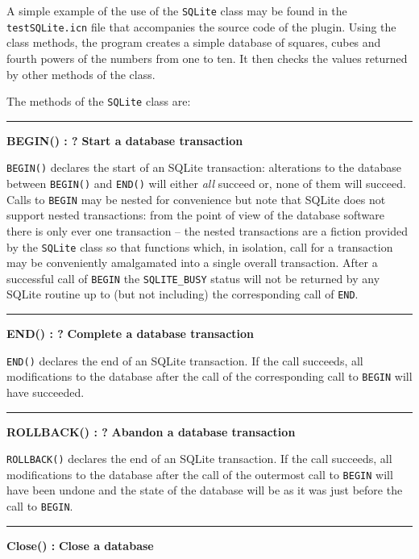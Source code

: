 \noindent
A simple example of the use of the \texttt{SQLite} class may be found in the
\texttt{testSQLite.icn} file that accompanies the source code of the plugin.
Using the class methods, the program creates a simple database of squares, cubes
and fourth powers of the numbers from one to ten. It then checks the values
returned by other methods of the class.

\noindent
The methods of the \texttt{SQLite} class are:
\bigskip\hrule\vspace{0.1cm}
\noindent
{\bf BEGIN() : ? } \hfill {\bf Start a database transaction}

\noindent
\texttt{BEGIN()} declares the start of an SQLite transaction: alterations to
the database between \texttt{BEGIN()} and \texttt{END()} will either {\em
  all\/} succeed or, none of them will succeed. Calls to \texttt{BEGIN} may
be nested for convenience but note that SQLite does not support nested
transactions: from the point of view of the database software there is only
ever one transaction -- the nested transactions are a fiction provided by the
\texttt{SQLite} class so that functions which, in isolation, call for a
transaction may be conveniently amalgamated into a single overall transaction.
After a successful call of \texttt{BEGIN} the \texttt{SQLITE\_BUSY} status will
not be returned by any SQLite routine up to (but not including) the
corresponding call of \texttt{END}.

\bigskip\hrule\vspace{0.1cm}
\noindent
{\bf END() : ? } \hfill {\bf Complete a database transaction}

\noindent
\texttt{END()} declares the end of an SQLite transaction. If the call
succeeds, all modifications to the database after the call of the
corresponding call to \texttt{BEGIN} will have succeeded.

\bigskip\hrule\vspace{0.1cm}
\noindent
{\bf ROLLBACK() : ? } \hfill {\bf Abandon a database transaction}

\noindent
\texttt{ROLLBACK()} declares the end of an SQLite transaction. If the call
succeeds, all modifications to the database after the call of the
outermost call to \texttt{BEGIN} will have been undone and the state of
the database will be as it was just before the call to \texttt{BEGIN}.

\bigskip\hrule\vspace{0.1cm}
\noindent
{\bf Close() : } \hfill {\bf Close a database}

